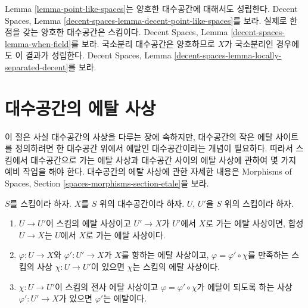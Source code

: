 \begin{remark}
\label{remark-cannot-decide-yet}
Lemma \ref{lemma-point-like-spaces}는 양호한 대수공간에 대해서도 성립한다.
Decent Spaces, Lemma
\ref{decent-spaces-lemma-decent-point-like-spaces}를 보라.
실제로 한 점을 갖는 양호한 대수공간은 스킴이다. Decent Spaces, Lemma
\ref{decent-spaces-lemma-when-field}를 보라. 국소분리 대수공간은
양호하므로 $X$가 국소분리인 경우에도 이 결과가 성립한다. Decent Spaces,
Lemma \ref{decent-spaces-lemma-locally-separated-decent}를 보라.
\end{remark}
\section{대수공간의 에탈 사상}
\label{section-etale-morphisms}

\noindent
이 절은 사실 대수공간의 사상을 다루는 장에 속하지만, 대수공간의
작은 에탈 사이트를 정의하려면 한 대수공간 위에서 에탈인 대수공간이라는
개념이 필요하다. 따라서 스킴에서 대수공간으로 가는 에탈 사상과
대수공간 사이의 에탈 사상에 관하여 몇 가지 예비 작업을 해야 한다.
대수공간의 에탈 사상에 관한 자세한 내용은
Morphisms of Spaces, Section \ref{spaces-morphisms-section-etale}을 보라.

\begin{lemma}
\label{lemma-etale-over-space}
$S$를 스킴이라 하자.
$X$를 $S$ 위의 대수공간이라 하자.
$U$, $U'$을 $S$ 위의 스킴이라 하자.
\begin{enumerate}
\item $U \to U'$이 스킴의 에탈 사상이고
$U' \to X$가 $U'$에서 $X$로 가는 에탈 사상이면, 합성
$U \to X$는 $U$에서 $X$로 가는 에탈 사상이다.
\item $\varphi : U \to X$와 $\varphi' : U' \to X$가
$X$를 향하는 에탈 사상이고, $\varphi = \varphi' \circ \chi$를
만족하는 스킴의 사상 $\chi : U \to U'$이 있으면
$\chi$는 스킴의 에탈 사상이다.
\item $\chi : U \to U'$이 스킴의 전사 에탈 사상이고
$\varphi = \varphi' \circ \chi$가 에탈이 되도록 하는 사상
$\varphi' : U' \to X$가 있으면 $\varphi'$는 에탈이다.
\end{enumerate}
\end{lemma}

